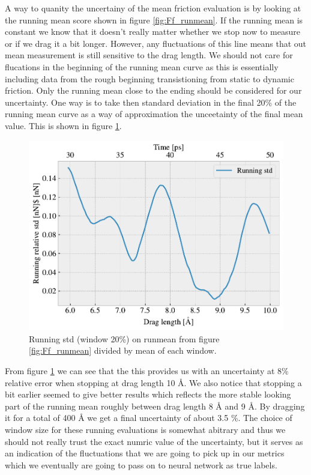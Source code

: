A way to quanity the uncertainy of the mean friction evaluation is by looking at the running mean score shown in figure \ref{fig:Ff_runmean}. If the running mean is constant we know that it doesn't really matter whether we stop now to measure or if we drag it a bit longer. However, any fluctuations of this line means that out mean measurement is still sensitive to the drag length. We should not care for flucations in the beginning of the running mean curve as this is essentially including data from the rough beginning transistioning from static to dynamic friction. Only the running mean close to the ending should be considered for our uncertainty. One way is to take then standard deviation in the final 20\% of the running mean curve as a way of approximation the unceetainty of the final mean value. This is shown in figure \ref{fig:Ff_runstd}. 

\begin{figure}[H]
  \centering
  \includegraphics[width=0.7\linewidth]{figures/baseline/Ff_running_std.pdf}
  \caption{Running std (window 20\%) on runmean from figure \ref{fig:Ff_runmean} divided by mean of each window. }
  \label{fig:Ff_runstd}
\end{figure}

From figure \ref{fig:Ff_runstd} we can see that the this provides us with an uncertainty at 8\% relative error when stopping at drag length 10 Å. We also notice that stopping a bit earlier seemed to give better results which reflects the more stable looking part of the running mean roughly between drag length 8 Å and 9 Å. By dragging it for a total of 400 Å we get a final uncertainty of about 3.5 \%. The choice of window size for these running evaluations is somewhat abitrary and thus we should not really trust the exact numric value of the uncertainty, but it serves as an indication of the fluctuations that we are going to pick up in our metrics which we eventually are going to pass on to neural network as true labels. \\

